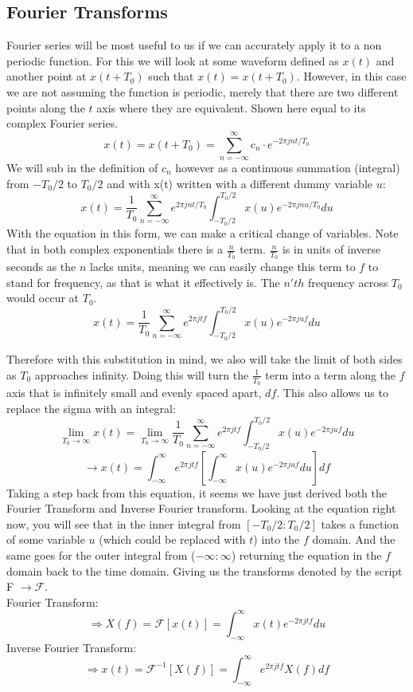 \documentclass[12pt]{article}
\begin{document}
\subsection{Fourier Transforms}
Fourier series will be most useful to us if we can accurately apply it to a non periodic function. For this we will look at some waveform defined as $x(t)$ and another point at $x(t+T_0)$ such that $x(t) = x(t+T_0)$. However, in this case we are not assuming the function is periodic, merely that there are two different points along the $t$ axis where they are equivalent. Shown here equal to its complex Fourier series. $$x(t) = x(t+T_0) = \sum_{n=-\infty}^{\infty} c_n \cdot e^{-2\pi jnt/T_0}$$ We will sub in the definition of $c_n$ however as a continuous summation (integral) from $-T_0/2$ to $T_0/2$ and with x(t) written with a different dummy variable $u$: $$ x(t) = \frac{1}{T_0} \sum_{n=-\infty}^{\infty}e^{2\pi jnt/T_0} \int_{-T_0/2}^{T_0/2} x(u)e^{-2\pi jnu/T_0} du $$ With the equation in this form, we can make a critical change of variables. Note that in both complex exponentials there is a $\frac{n}{T_0}$ term. $\frac{n}{T_0}$ is in units of inverse seconds as the $n$ lacks units, meaning we can easily change this term to $f$ to stand for frequency, as that is what it effectively is. The $n'th$ frequency across $T_0$ would occur at $T_0$.
$$ x(t) = \frac{1}{T_0} \sum_{n=-\infty}^{\infty}e^{2\pi jtf} \int_{-T_0/2}^{T_0/2} x(u)e^{-2\pi juf} du $$

Therefore with this substitution in mind, we also will take the limit of both sides as $T_0$ approaches infinity. Doing this will turn the $\frac{1}{T_0}$ term into a term along the $f$ axis that is infinitely small and evenly spaced apart, $df$. This also allows us to replace the sigma with an integral: $$\lim_{T_0\to\infty} x(t) = \lim_{T_0\to\infty} \frac{1}{T_0} \sum_{n=-\infty}^{\infty}e^{2\pi jtf} \int_{-T_0/2}^{T_0/2} x(u)e^{-2\pi juf} du $$ $$\rightarrow x(t) = \int_{-\infty}^{\infty}e^{2\pi jtf} [\int_{-\infty}^{\infty} x(u)e^{-2\pi juf} du] df $$ 
Taking a step back from this equation, it seems we have just derived both the Fourier Transform and Inverse Fourier transform. Looking at the equation right now, you will see that in the inner integral from $[-T_0/2:T_0/2]$ takes a function of some variable $u$ (which could be replaced with $t$) into the $f$ domain. And the same goes for the outer integral from ($-\infty:\infty$) returning the equation in the $f$ domain back to the time domain. Giving us the transforms denoted by the script F $\rightarrow \mathscr{F}$. \\
Fourier Transform: $$\Rightarrow X(f) = \mathscr{F}[x(t)] = \int_{-\infty}^{\infty} x(t)e^{-2\pi jtf} du $$ Inverse Fourier Transform: $$\Rightarrow x(t) = \mathscr{F}^{-1}[X(f)] = \int_{-\infty}^{\infty}e^{2\pi jtf} X(f) df$$  	
\end{document}
